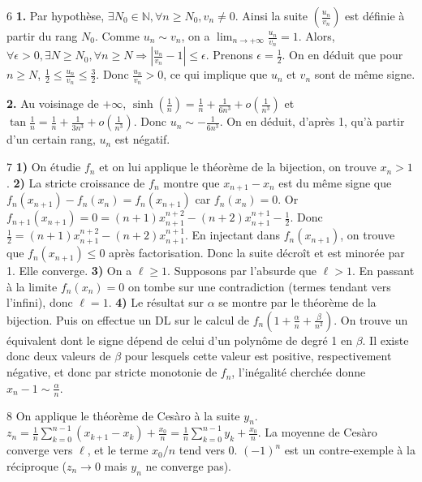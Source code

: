 \begin{correction}{6}
\textbf{1.} Par hypothèse, $\exists N_{0}\in\mathbb{N}, \forall n\ge N_{0}, v_{n}\ne0$.
Ainsi la suite $(\frac{u_{n}}{v_{n}})$ est définie à partir du rang $N_{0}$.
Comme $u_{n}\sim v_{n}$, on a $\lim_{n\rightarrow+\infty}\frac{u_{n}}{v_{n}}=1$.
Alors, $\forall\epsilon>0, \exists N\ge N_{0}, \forall n\ge N \Rightarrow |\frac{u_{n}}{v_{n}}-1|\le\epsilon$.
Prenons $\epsilon=\frac{1}{2}$. On en déduit que pour $n \ge N$, $\frac{1}{2} \le \frac{u_n}{v_n} \le \frac{3}{2}$.
Donc $\frac{u_{n}}{v_{n}}>0$, ce qui implique que $u_{n}$ et $v_{n}$ sont de même signe.

\textbf{2.} Au voisinage de $+\infty$, $\sinh(\frac{1}{n})=\frac{1}{n}+\frac{1}{6n^{3}}+o(\frac{1}{n^{3}})$ et $\tan\frac{1}{n}=\frac{1}{n}+\frac{1}{3n^{3}}+o(\frac{1}{n^{3}})$.
Donc $u_{n}\sim -\frac{1}{6n^{3}}$.
On en déduit, d'après 1, qu'à partir d'un certain rang, $u_{n}$ est négatif.
\end{correction}

\begin{correction}{7}
\textbf{1)} On étudie $f_{n}$ et on lui applique le théorème de la bijection, on trouve $x_{n}>1$.
\textbf{2)} La stricte croissance de $f_{n}$ montre que $x_{n+1}-x_{n}$ est du même signe que $f_{n}(x_{n+1})-f_{n}(x_{n})=f_{n}(x_{n+1})$ car $f_n(x_n)=0$.
Or $f_{n+1}(x_{n+1})=0=(n+1)x_{n+1}^{n+2}-(n+2)x_{n+1}^{n+1}-\frac{1}{2}$.
Donc $\frac{1}{2}=(n+1)x_{n+1}^{n+2}-(n+2)x_{n+1}^{n+1}$.
En injectant dans $f_n(x_{n+1})$, on trouve que $f_{n}(x_{n+1}) \le 0$ après factorisation.
Donc la suite décroît et est minorée par 1. Elle converge.
\textbf{3)} On a $\ell\ge1$. Supposons par l'absurde que $\ell>1$. En passant à la limite $f_{n}(x_{n})=0$ on tombe sur une contradiction (termes tendant vers l'infini), donc $\ell=1$.
\textbf{4)} Le résultat sur $\alpha$ se montre par le théorème de la bijection.
Puis on effectue un DL sur le calcul de $f_{n}(1+\frac{\alpha}{n}+\frac{\beta}{n^{2}})$.
On trouve un équivalent dont le signe dépend de celui d'un polynôme de degré 1 en $\beta$.
Il existe donc deux valeurs de $\beta$ pour lesquels cette valeur est positive, respectivement négative, et donc par stricte monotonie de $f_{n}$, l'inégalité cherchée donne $x_{n} - 1 \sim \frac{\alpha}{n}$.
\end{correction}

\begin{correction}{8}
On applique le théorème de Cesàro à la suite $y_{n}$.
$z_n = \frac{1}{n} \sum_{k=0}^{n-1} (x_{k+1}-x_k) + \frac{x_0}{n} = \frac{1}{n} \sum_{k=0}^{n-1} y_k + \frac{x_0}{n}$.
La moyenne de Cesàro converge vers $\ell$, et le terme $x_0/n$ tend vers 0.
$(-1)^n$ est un contre-exemple à la réciproque ($z_n \to 0$ mais $y_n$ ne converge pas).
\end{correction}
